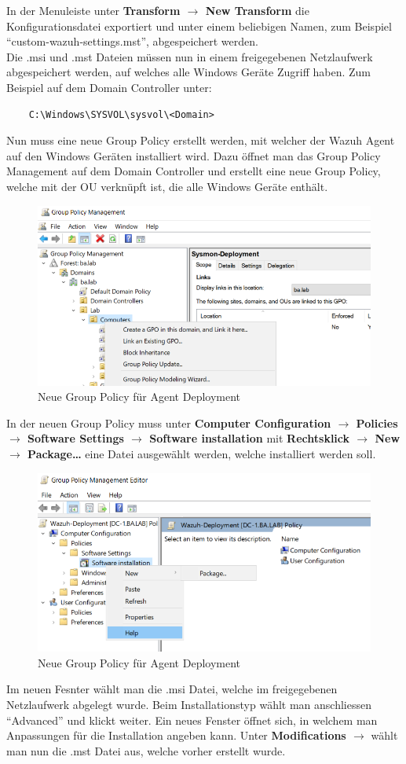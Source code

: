 In der Menuleiste unter \textbf{Transform $\rightarrow$ New Transform} die Konfigurationsdatei exportiert und unter einem beliebigen Namen, zum Beispiel ``custom-wazuh-settings.mst'', abgespeichert werden.\\

Die .msi und .mst Dateien müssen nun in einem freigegebenen Netzlaufwerk abgespeichert werden, auf welches alle Windows Geräte Zugriff haben. Zum Beispiel auf dem Domain Controller unter:
\begin{lstlisting}
    C:\Windows\SYSVOL\sysvol\<Domain>
\end{lstlisting}

Nun muss eine neue Group Policy erstellt werden, mit welcher der Wazuh Agent auf den Windows Geräten installiert wird.
Dazu öffnet man das Group Policy Management auf dem Domain Controller und erstellt eine neue Group Policy, welche mit der OU verknüpft ist, die alle Windows Geräte enthält.
\begin{figure}[H]
    \centering
    \includegraphics[width=0.7\linewidth]{../img/agent/create-new-group-policy.png}
    \caption{Neue Group Policy für Agent Deployment}
\end{figure}

In der neuen Group Policy muss unter \textbf{Computer Configuration $\rightarrow$ Policies $\rightarrow$ Software Settings $\rightarrow$ Software installation} mit \textbf{Rechtsklick $\rightarrow$ New $\rightarrow$ Package\dots} eine Datei ausgewählt werden, welche installiert werden soll.

\begin{figure}[H]
    \centering
    \includegraphics[width=0.7\linewidth]{../img/agent/new-software-install.png}
    \caption{Neue Group Policy für Agent Deployment}
\end{figure}
Im neuen Fesnter wählt man die .msi Datei, welche im freigegebenen Netzlaufwerk abgelegt wurde.
Beim Installationstyp wählt man anschliessen ``Advanced'' und klickt weiter.
Ein neues Fenster öffnet sich, in welchem man Anpassungen für die Installation angeben kann.
Unter \textbf{Modifications $\rightarrow$} wählt man nun die .mst Datei aus, welche vorher erstellt wurde.\\

